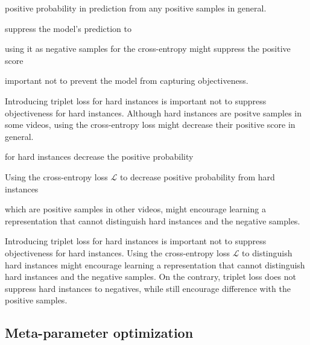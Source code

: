 \documentclass[letterpaper]{article} %
\begin{document}
positive probability in prediction from any positive samples in general.



suppress the model's prediction to 

using it as negative samples for the cross-entropy might suppress the positive score

important not to prevent the model from capturing objectiveness.


Introducing triplet loss for hard instances is important not to suppress objectiveness for hard instances.
Although hard instances are positve samples in some videos, using the cross-entropy loss might decrease their positive score in general.


for hard instances decrease the positive probability 

Using the cross-entropy loss $\mathcal{L}$ to decrease positive probability from hard instances

which are positive samples in other videos, might encourage learning a representation that cannot distinguish hard instances and the negative samples. 

Introducing triplet loss for hard instances is important not to suppress objectiveness for hard instances.
Using the cross-entropy loss $\mathcal{L}$ to distinguish hard instances might encourage learning a representation that cannot distinguish hard instances and the negative samples. 
On the contrary, triplet loss does not suppress hard instances to negatives, while still encourage difference with the positive samples.
\fi

\subsection{Meta-parameter optimization}
\end{document}
